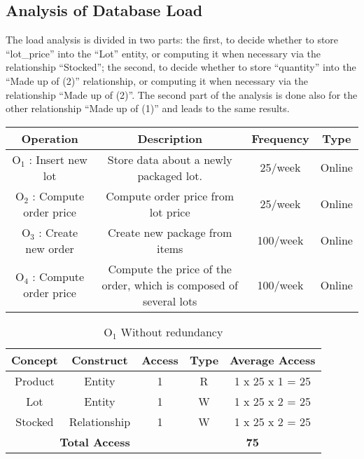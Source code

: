 \subsection{Analysis of Database Load}
The load analysis is divided in two parts: the first, to decide whether to store ``lot\_price'' into the ``Lot'' entity, or computing it when necessary via the relationship ``Stocked''; the second, to decide whether to store ``quantity'' into the ``Made up of (2)'' relationship, or computing it when necessary via the relationship ``Made up of (2)''. The second part of the analysis is done also for the other relationship ``Made up of (1)'' and leads to the same results.

\begin{center}
	\begin{tabular}[!h]{ | c | c | c | c | }
		\hline
		\textbf{Operation} & \textbf{Description} & \textbf{Frequency} & \textbf{Type} \\ \hline
		$ \textrm{O}_\textrm{1} $ : Insert new lot & Store data about a newly packaged lot. & 25/week & Online \\ \hline
		$ \textrm{O}_\textrm{2} $ : Compute order price  & Compute order price from lot price & 25/week & Online \\\hline
		$ \textrm{O}_\textrm{3} $ : Create new order & Create new package from items & 100/week & Online \\\hline
		$ \textrm{O}_\textrm{4} $ : Compute order price & Compute the price of the order, which is composed of several lots & 100/week & Online \\\hline
	\end{tabular}
\end{center}
\begin{table}[!h]\caption{	$ \textrm{O}_\textrm{1} $ Without redundancy}
	\begin{center}
		\begin{tabular}{| c | c | c | c | c |}
			\hline
			\textbf{Concept} & \textbf{Construct} & \textbf{Access} & \textbf{Type} & \textbf{Average Access} \\ \hline
			Product & Entity & 1 & R & 1 x 25 x 1 = 25 \\ \hline
			Lot & Entity & 1 & W & 1 x 25 x 2 = 25 \\ \hline
			Stocked & Relationship & 1 & W & 1 x 25 x 2 = 25 \\ \hline
			\multicolumn{3}{|c|}{\textbf{Total Access}} & \multicolumn{2}{|c|}{\textbf{75}} \\ \hline
		\end{tabular}
	\end{center}
\end{table}
